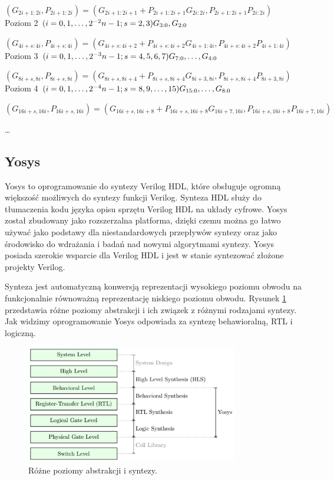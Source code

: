 \documentclass[12pt,oneside,reqno]{article}
\begin{document}
$(G_{2i+1:2i},P_{2i+1:2i})=(G_{2i+1:2i+1}+P_{2i+1:2i+1}G_{2i:2i}, P_{2i+1:2i+1}P_{2i:2i})$\\

Poziom 2 $(i=0,1,\dots,2^{- 2}n-1; s=2,3)\hfill G_{3:0}, G_{2:0}$

$(G_{4i+s:4i},P_{4i+s:4i})=(G_{4i+s:4i+2}+P_{4i+s:4i+2}G_{4i+1:4i},P_{4i+s:4i+2}P_{4i+1:4i})$\\

Poziom 3 $(i=0,1,\dots,2^{- 3}n-1; s=4,5,6,7)\hfill G_{7:0} ,\dots,G_{4:0}$

$(G_{8i+s,8i},P_{8i+s,8i})=(G_{8i+s,8i+4}+P_{8i+s,8i+4}G_{8i+3,8i}, P_{8i+s,8i+4}P_{8i+3,8i})$\\

Poziom 4 $(i=0,1,\dots,2^{- 4}n-1; s=8,9,\dots,15)\hfill G_{15:0} ,\dots,G_{8:0}$

$(G_{16i+s,16i},P_{16i+s,16i})=(G_{16i+s,16i+8}+P_{16i+s,16i+8}G_{16i+7,16i},P_{16i+s,16i+8}P_{16i+7,16i})$

\dots

\setlength{\parskip}{0.5em}

\subsection{Yosys}
Yosys \cite{yosys} to oprogramowanie do syntezy Verilog HDL, które obsługuje ogromną większość możliwych do syntezy funkcji Verilog. Synteza HDL służy do tłumaczenia kodu języka opisu sprzętu Verilog HDL na układy cyfrowe. Yosys został zbudowany jako rozszerzalna platforma, dzięki czemu można go łatwo używać jako podstawy dla niestandardowych przepływów syntezy oraz jako środowisko do wdrażania i badań nad nowymi algorytmami syntezy. Yosys posiada szerokie wsparcie dla Verilog HDL i jest w stanie syntezować złożone projekty Verilog. \cite{yosys-manual}

Synteza jest automatyczną konwersją reprezentacji wysokiego poziomu obwodu na funkcjonalnie równoważną reprezentację niskiego poziomu obwodu. Rysunek \ref{fig:abstract} przedstawia różne poziomy abstrakcji i ich związek z różnymi rodzajami syntezy. Jak widzimy oprogramowanie Yosys odpowiada za syntezę behawioralną, RTL i logiczną.
\begin{figure}[H]
\centering
\includegraphics[width=350px]{images/abstract.jpg}
\caption{Różne poziomy abstrakcji i syntezy. \cite{yosys-manual}}\label{fig:abstract}
\end{figure}
\end{document}
